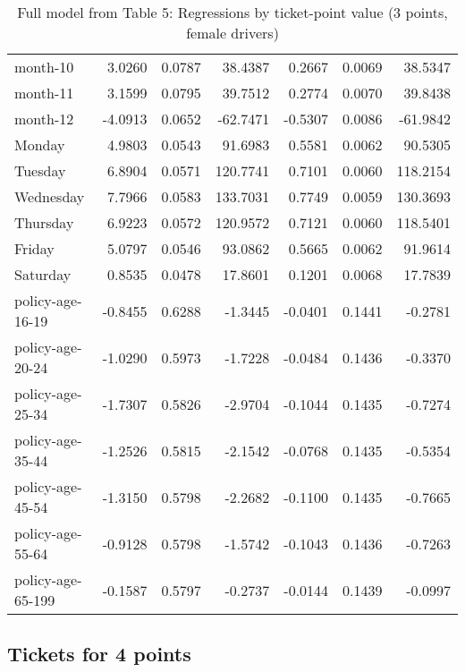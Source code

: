 \documentclass[10pt]{article}
\begin{document}
\begin{table}[ht]
\begin{tabular}{lrrrrrr}
  month-10 & 3.0260 & 0.0787 & 38.4387 & 0.2667 & 0.0069 & 38.5347 \\ 
  month-11 & 3.1599 & 0.0795 & 39.7512 & 0.2774 & 0.0070 & 39.8438 \\ 
  month-12 & -4.0913 & 0.0652 & -62.7471 & -0.5307 & 0.0086 & -61.9842 \\ 
  Monday & 4.9803 & 0.0543 & 91.6983 & 0.5581 & 0.0062 & 90.5305 \\ 
  Tuesday & 6.8904 & 0.0571 & 120.7741 & 0.7101 & 0.0060 & 118.2154 \\ 
  Wednesday & 7.7966 & 0.0583 & 133.7031 & 0.7749 & 0.0059 & 130.3693 \\ 
  Thursday & 6.9223 & 0.0572 & 120.9572 & 0.7121 & 0.0060 & 118.5401 \\ 
  Friday & 5.0797 & 0.0546 & 93.0862 & 0.5665 & 0.0062 & 91.9614 \\ 
  Saturday & 0.8535 & 0.0478 & 17.8601 & 0.1201 & 0.0068 & 17.7839 \\ 
  policy-age-16-19 & -0.8455 & 0.6288 & -1.3445 & -0.0401 & 0.1441 & -0.2781 \\ 
  policy-age-20-24 & -1.0290 & 0.5973 & -1.7228 & -0.0484 & 0.1436 & -0.3370 \\ 
  policy-age-25-34 & -1.7307 & 0.5826 & -2.9704 & -0.1044 & 0.1435 & -0.7274 \\ 
  policy-age-35-44 & -1.2526 & 0.5815 & -2.1542 & -0.0768 & 0.1435 & -0.5354 \\ 
  policy-age-45-54 & -1.3150 & 0.5798 & -2.2682 & -0.1100 & 0.1435 & -0.7665 \\ 
  policy-age-55-64 & -0.9128 & 0.5798 & -1.5742 & -0.1043 & 0.1436 & -0.7263 \\ 
  policy-age-65-199 & -0.1587 & 0.5797 & -0.2737 & -0.0144 & 0.1439 & -0.0997 \\ 
   \hline
\end{tabular}
\caption{Full model from Table 5: Regressions by ticket-point value (3 points, female drivers)} 
\label{tab_5_3_pts_F}
\end{table}


\clearpage
\pagebreak




\subsection{Tickets for 4 points}
\end{document}
